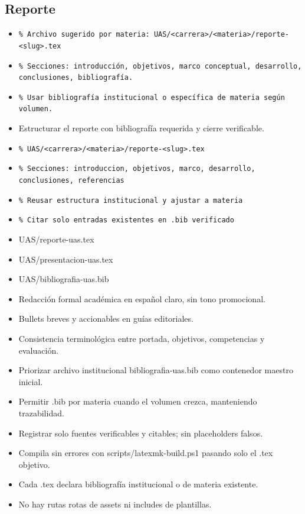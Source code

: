 \documentclass[12pt]{article}
\begin{document}
\subsection*{Reporte}
\begin{itemize}[leftmargin=*]
  \item \texttt{\% Archivo sugerido por materia: UAS/<carrera>/<materia>/reporte-<slug>.tex}
  \item \texttt{\% Secciones: introducción, objetivos, marco conceptual, desarrollo, conclusiones, bibliografía.}
  \item \texttt{\% Usar bibliografía institucional o específica de materia según volumen.}
  \item Estructurar el reporte con bibliografía requerida y cierre verificable.
  \item \texttt{\% UAS/<carrera>/<materia>/reporte-<slug>.tex}
  \item \texttt{\% Secciones: introduccion, objetivos, marco, desarrollo, conclusiones, referencias}
  \item \texttt{\% Reusar estructura institucional y ajustar a materia}
  \item \texttt{\% Citar solo entradas existentes en .bib verificado}
  \item UAS/reporte-uas.tex
  \item UAS/presentacion-uas.tex
  \item UAS/bibliografia-uas.bib
  \item Redacción formal académica en español claro, sin tono promocional.
  \item Bullets breves y accionables en guías editoriales.
  \item Consistencia terminológica entre portada, objetivos, competencias y evaluación.
  \item Priorizar archivo institucional bibliografia-uas.bib como contenedor maestro inicial.
  \item Permitir .bib por materia cuando el volumen crezca, manteniendo trazabilidad.
  \item Registrar solo fuentes verificables y citables; sin placeholders falsos.
  \item Compila sin errores con scripts/latexmk-build.ps1 pasando solo el .tex objetivo.
  \item Cada .tex declara bibliografía institucional o de materia existente.
  \item No hay rutas rotas de assets ni includes de plantillas.
\end{itemize}
\end{document}
